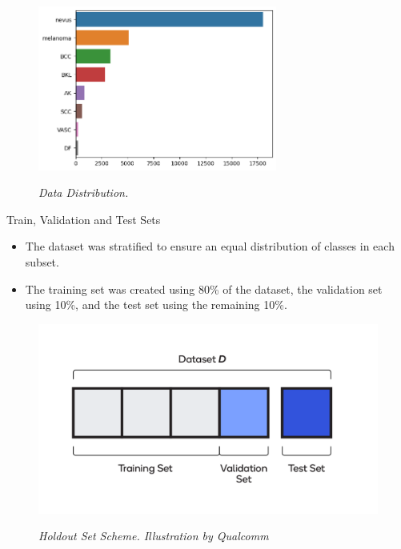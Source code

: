 \documentclass[dvipsnames,mathserif]{beamer}
\begin{document}
{\begin{frame}
      \begin{figure}[H]
        \centering
        \includegraphics[width=0.7\textwidth]{images/hole-dataset-diagnosis.png}
        \caption[Data Distribution]{\textit{Data Distribution. }}
        {\label{fig:hole-dataset-distribution}}
      \end{figure}

    \end{frame}

    \begin{frame}

      \large  Train, Validation and Test Sets
      \vspace{0.25cm}

      \footnotesize

      \begin{itemize}
        \item The dataset was stratified to ensure an equal distribution of classes in each subset.
        \item The training set was created using 80\% of the dataset, the validation set using 10\%, and the test set using the remaining 10\%.
      \end{itemize}


      \begin{figure}[H]
        \centering
        \begin{adjustbox}{width=0.5\textwidth, trim={0cm 0.5cm 0cm 0.5cm}, clip}
          \includegraphics[width=\textwidth]{images/train-test-validation-sets.png}
        \end{adjustbox}
        \caption[Holdout Set Scheme]{\textit{Holdout Set Scheme. Illustration by Qualcomm}}
        {\label{fig:holdout-test-scheme}}
      \end{figure}


\end{frame}}
\end{document}
